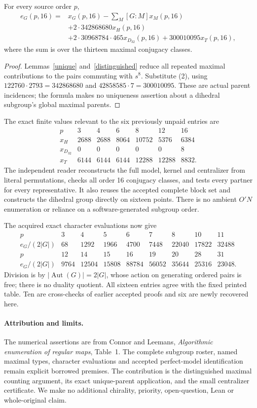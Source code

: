\documentclass[11pt,a4paper]{article}
\begin{document}
\begin{theorem}
For every source order $p$,
\begin{align*}
e_G(p,16)={}&x_G(p,16)-\sum_M[G:M]x_M(p,16)\\
 &+2\cdot342868680x_H(p,16)\\
 &+2\cdot30968784\cdot465x_{D_{32}}(p,16)
   +300010095x_T(p,16),
\end{align*}
where the sum is over the thirteen maximal conjugacy classes.
\end{theorem}
\begin{proof}
Lemmas~\ref{unique} and~\ref{distinguished} reduce all repeated
maximal contributions to the pairs commuting with $s^8$.
Substitute (2), using $122760\cdot2793=342868680$ and
$42858585\cdot7=300010095$. These are actual parent incidences;
the formula makes no uniqueness assertion about a dihedral
subgroup's global maximal parents.
\end{proof}

The exact finite values relevant to the six previously unpaid
entries are
\[
\begin{array}{c|rrrrrr}
p&3&4&6&8&12&16\\\hline
x_H&2688&2688&8064&10752&5376&6384\\
x_{D_{32}}&0&0&0&0&0&8\\
x_T&6144&6144&6144&12288&12288&8832.
\end{array}
\]
The independent reader reconstructs the full model, kernel and
centralizer from literal permutations, checks all order 16
conjugacy classes, and tests every partner for every representative.
It also reuses the accepted complete block set and constructs the
dihedral group directly on sixteen points. There is no ambient
$O'N$ enumeration or reliance on a software-generated subgroup order.

The acquired exact character evaluations now give
\[
\begin{array}{c|rrrrrrrr}
p&3&4&5&6&7&8&10&11\\\hline
e_G/(2|G|)&68&1292&1966&4700&7448&22040&17822&32488\\[2pt]
p&12&14&15&16&19&20&28&31\\\hline
e_G/(2|G|)&9764&12504&15808&88784&56052&35644&25316&23048.
\end{array}
\]
Division is by $|\operatorname{Aut}(G)|=2|G|$, whose action on
generating ordered pairs is free; there is no duality quotient.
All sixteen entries agree with the fixed printed table. Ten
are cross-checks of earlier accepted proofs and six are newly
recovered here.

\paragraph{Attribution and limits.}
The numerical assertions are from Connor and Leemans,
\emph{Algorithmic enumeration of regular maps}, Table~1.
The complete subgroup roster, named maximal types, character
evaluations and accepted perfect-model identification remain
explicit borrowed premises. The contribution is the distinguished
maximal counting argument, its exact unique-parent application,
and the small centralizer certificate. We make no additional
chirality, priority, open-question, Lean or whole-original claim.
\end{document}
